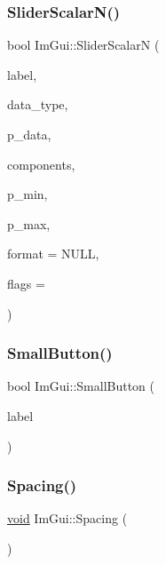 \subsubsection{\texorpdfstring{Slider\+Scalar\+N()}{SliderScalarN()}}
{\footnotesize\ttfamily bool Im\+Gui\+::\+Slider\+ScalarN (\begin{DoxyParamCaption}\item[{const char $\ast$}]{label,  }\item[{Im\+Gui\+Data\+Type}]{data\+\_\+type,  }\item[{\hyperlink{imgui__impl__opengl3__loader_8h_ac668e7cffd9e2e9cfee428b9b2f34fa7}{void} $\ast$}]{p\+\_\+data,  }\item[{int}]{components,  }\item[{const \hyperlink{imgui__impl__opengl3__loader_8h_ac668e7cffd9e2e9cfee428b9b2f34fa7}{void} $\ast$}]{p\+\_\+min,  }\item[{const \hyperlink{imgui__impl__opengl3__loader_8h_ac668e7cffd9e2e9cfee428b9b2f34fa7}{void} $\ast$}]{p\+\_\+max,  }\item[{const char $\ast$}]{format = {\ttfamily NULL},  }\item[{Im\+Gui\+Slider\+Flags}]{flags = {} }\end{DoxyParamCaption})}

\mbox{\label{namespaceImGui_a5b76ec69758aeb0a00a66f142f7a4fb2}} 
\subsubsection{\texorpdfstring{Small\+Button()}{SmallButton()}}
{\footnotesize\ttfamily bool Im\+Gui\+::\+Small\+Button (\begin{DoxyParamCaption}\item[{const char $\ast$}]{label }\end{DoxyParamCaption})}

\mbox{\label{namespaceImGui_a2659e2bfe84b4cad0facd65d5c1ac90d}} 
\subsubsection{\texorpdfstring{Spacing()}{Spacing()}}
{\footnotesize\ttfamily \hyperlink{imgui__impl__opengl3__loader_8h_ac668e7cffd9e2e9cfee428b9b2f34fa7}{void} Im\+Gui\+::\+Spacing (\begin{DoxyParamCaption}{ }\end{DoxyParamCaption})}

